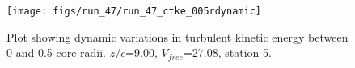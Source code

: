 \begin{figure}[H]
\centering
\texttt{[image: figs/run\_47/run\_47\_ctke\_005rdynamic]}
\caption{Plot showing dynamic variations in turbulent kinetic energy between 0 and 0.5 core radii. $z/c$=9.00, $V_{free}$=27.08, station 5.}
\end{figure}


